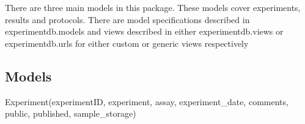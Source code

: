 \documentclass[letterpaper,10pt,english]{sphinxmanual}
\begin{document}
There are three main models in this package.  These models cover experiments, results and protocols.  There are model specifications described in experimentdb.models and views described in either experimentdb.views or experimentdb.urls for either custom or generic views respectively



\subsection{Models}
\label{api:models}\label{api:module-experimentdb.data.models}

\begin{fulllineitems}
\label{api:experimentdb.data.models.Experiment}
Experiment(experimentID, experiment, assay, experiment\_date, comments, public, published, sample\_storage)


\begin{fulllineitems}
\label{api:experimentdb.data.models.Experiment.DoesNotExist}
\end{fulllineitems}


\begin{fulllineitems}
\label{api:experimentdb.data.models.Experiment.MultipleObjectsReturned}
\end{fulllineitems}


\begin{fulllineitems}
\label{api:experimentdb.data.models.Experiment.antibodies}
\end{fulllineitems}


\begin{fulllineitems}
\label{api:experimentdb.data.models.Experiment.cellline}
\end{fulllineitems}


\end{fulllineitems}
\end{document}
